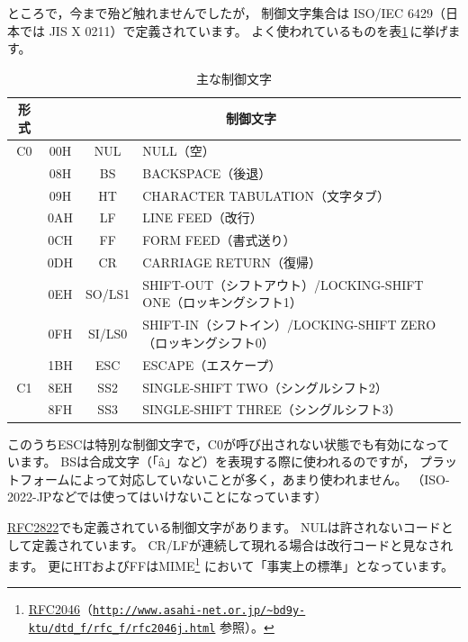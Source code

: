 \documentclass[a4j,10pt,fleqn]{jsarticle}
\begin{document}
ところで，今まで殆ど触れませんでしたが，
制御文字集合は ISO/IEC 6429（日本では JIS X 0211）で定義されています。
よく使われているものを表\ref{tbl:control-codes}\,に挙げます。
\begin{table}[htp]
\begin{center}\begin{tabular}{|c|c|c|l|}
    \hline
    形式 & \multicolumn{3}{c|}{制御文字} \\ \hline
    \hline
    C0   & 00H & NUL    & NULL（空） \\ \cline{2-4}
         & 08H & BS     & BACKSPACE（後退） \\ \cline{2-4}
         & 09H & HT     & CHARACTER TABULATION（文字タブ） \\ \cline{2-4}
         & 0AH & LF     & LINE FEED（改行） \\ \cline{2-4}
         & 0CH & FF     & FORM FEED（書式送り） \\ \cline{2-4}
         & 0DH & CR     & CARRIAGE RETURN（復帰） \\ \cline{2-4}
         & 0EH & SO/LS1 & SHIFT-OUT（シフトアウト）/LOCKING-SHIFT ONE（ロッキングシフト1） \\ \cline{2-4}
         & 0FH & SI/LS0 & SHIFT-IN（シフトイン）/LOCKING-SHIFT ZERO（ロッキングシフト0） \\ \cline{2-4}
         & 1BH & ESC    & ESCAPE（エスケープ） \\
    \hline
    C1   & 8EH & SS2    & SINGLE-SHIFT TWO（シングルシフト2） \\ \cline{2-4}
         & 8FH & SS3    & SINGLE-SHIFT THREE（シングルシフト3） \\
    \hline
\end{tabular}\end{center}
\caption{主な制御文字}\label{tbl:control-codes}
\end{table}%

このうちESCは特別な制御文字で，C0が呼び出されない状態でも有効になっています。
BSは合成文字（「\^a」など）を表現する際に使われるのですが，
プラットフォームによって対応していないことが多く，あまり使われません。
（ISO-2022-JPなどでは使ってはいけないことになっています）

\href{ftp://ftp.isi.edu/in-notes/rfc2822.txt}{RFC2822}でも定義されている制御文字があります。
NULは許されないコードとして定義されています。
CR/LFが連続して現れる場合は改行コードと見なされます。
更にHTおよびFFはMIME\footnote{
    \href{ftp://ftp.isi.edu/in-notes/rfc2046.txt}{RFC2046}（\href{http://www.asahi-net.or.jp/~bd9y-ktu/dtd_f/rfc_f/rfc2046j.html}{\texttt{http://www.asahi-net.or.jp/\~{}bd9y-ktu/dtd\_f/rfc\_f/rfc2046j.html}} 参照）。
} において「事実上の標準」となっています。
\end{document}

